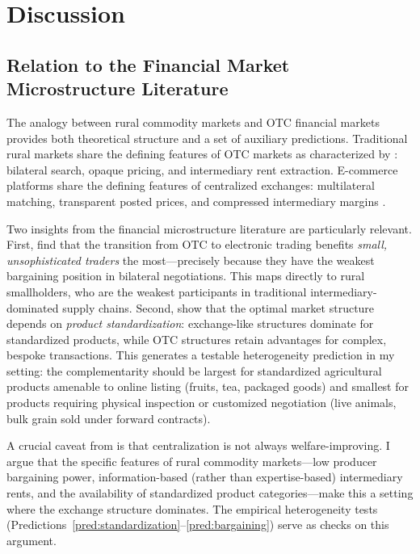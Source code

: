 \documentclass[12pt]{article}
\begin{document}
\section{Discussion}\label{sec:discussion}

\subsection{Relation to the Financial Market Microstructure Literature}

The analogy between rural commodity markets and OTC financial markets provides both theoretical structure and a set of auxiliary predictions. Traditional rural markets share the defining features of OTC markets as characterized by \citet{dgp2005}: bilateral search, opaque pricing, and intermediary rent extraction. E-commerce platforms share the defining features of centralized exchanges: multilateral matching, transparent posted prices, and compressed intermediary margins \citep{bessembinder2006,hendershott2015}.

Two insights from the financial microstructure literature are particularly relevant. First, \citet{hendershott2015} find that the transition from OTC to electronic trading benefits \textit{small, unsophisticated traders} the most---precisely because they have the weakest bargaining position in bilateral negotiations. This maps directly to rural smallholders, who are the weakest participants in traditional intermediary-dominated supply chains. Second, \citet{glode2020} show that the optimal market structure depends on \textit{product standardization}: exchange-like structures dominate for standardized products, while OTC structures retain advantages for complex, bespoke transactions. This generates a testable heterogeneity prediction in my setting: the complementarity should be largest for standardized agricultural products amenable to online listing (fruits, tea, packaged goods) and smallest for products requiring physical inspection or customized negotiation (live animals, bulk grain sold under forward contracts).

A crucial caveat from \citet{malamud2017} is that centralization is not always welfare-improving. I argue that the specific features of rural commodity markets---low producer bargaining power, information-based (rather than expertise-based) intermediary rents, and the availability of standardized product categories---make this a setting where the exchange structure dominates. The empirical heterogeneity tests (Predictions~\ref{pred:standardization}--\ref{pred:bargaining}) serve as checks on this argument.
\end{document}
